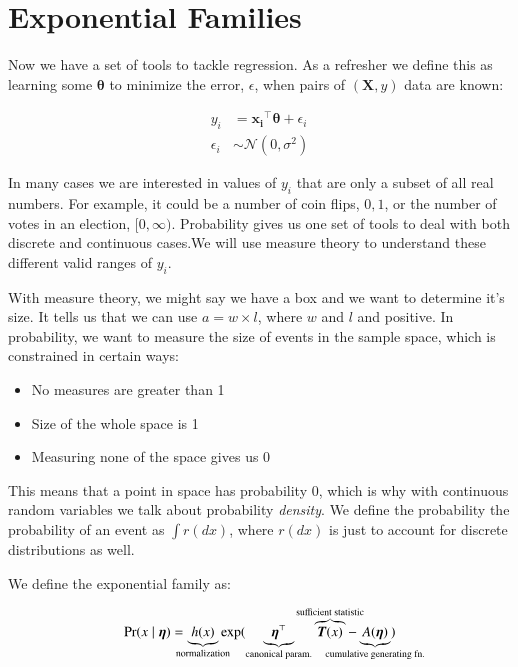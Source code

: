 \documentclass{article}
\begin{document}
\clearpage

\section{Exponential Families}

Now we have a set of tools to tackle regression. As a refresher we define this as learning some $\boldsymbol{\theta}$ to minimize the error, $\epsilon$, when pairs of $\left(\boldsymbol{X}, y\right)$ data are known: 


\begin{figure}[H]
\centering
{}
\end{figure}

\begin{align*}
    y_i & = \boldsymbol{x_i}^{\top} \boldsymbol{\theta} + \epsilon_i \\
    \epsilon_i & \sim \mathcal{N}\left(0, \sigma^2 \right)
\end{align*}

In many cases we are interested in values of $y_i$ that are only a subset of all real numbers. For example, it could be a number of coin flips, ${0, 1}$, or the number of votes in an election, $[0, \infty)$. Probability gives us one set of tools to deal with both discrete and continuous cases.We will use measure theory to understand these different valid ranges of $y_i$.

With measure theory, we might say we have a box and we want to determine it's size. It tells us that  we can use $a = w \times l$, where $w$ and $l$ and positive. In probability, we want to measure the size of events in the sample space, which is constrained in certain ways:

\begin{itemize}
    \item No measures are greater than 1
    \item Size of the whole space is 1
    \item Measuring none of the space gives us 0
\end{itemize}

This means that a point in space has probability 0, which is why with continuous random variables we talk about probability \textit{density}. We define the probability the probability of an event as $\int r(dx)$, where $r(dx)$ is just to account for discrete distributions as well.

We define the exponential family as:

$$
\Pr(x \mid \boldsymbol {\eta }) = \underbrace{h(x)}_{\mathclap{\text{normalization}}} \exp ( \underbrace{{\boldsymbol {\eta }}^{\top}}_{\text{canonical param.}} \overbrace{\boldsymbol{T}(x)}^{\mathclap{\text{sufficient statistic}}} - \underbrace{A(\boldsymbol {\eta })}_{\mathclap{\text{cumulative generating fn.}}} )
$$
\end{document}
